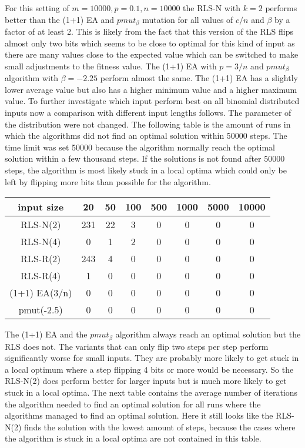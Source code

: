 For this setting of $m=10000, p=0.1, n=10000$ the RLS-N with $k=2$ performs better than the  (1+1) EA and $pmut_\beta$ mutation for all values of $c/n$ and $\beta$ by a factor of at least 2.
This is likely from the fact that this version of the RLS flips almost only two bits which seems to be close to optimal for this kind of input as there are many values close to the expected value which can be switched to make small adjustments to the fitness value.
The (1+1) EA with $p=3/n$ and $pmut_\beta$ algorithm with $\beta=-2.25$ perform almost the same.
The (1+1) EA has a slightly lower average value but also has a higher minimum value and a higher maximum value.
To further investigate which input perform best on all binomial distributed inputs now a comparison with different input lengths follows. The parameter of the distribution were not changed.
The following table is the amount of runs in which the algorithms did not find an optimal solution within 50000 steps.
The time limit was set 50000 because the algorithm normally reach the optimal solution within a few thousand steps.
If the solutions is not found after 50000 steps, the algorithm is most likely stuck in a local optima which could only be left by flipping more bits than possible for the algorithm.

\begin{tabular}{cccccccc}
      input size    & 20  & 50 & 100 & 500 & 1000 & 5000 & 10000 \\\hline
      RLS-N(2)      & 231 & 22 & 3   & 0   & 0    & 0    & 0     \\
      RLS-N(4)      & 0   & 1  & 2   & 0   & 0    & 0    & 0     \\
      RLS-R(2)      & 243 & 4  & 0   & 0   & 0    & 0    & 0     \\
      RLS-R(4)      & 1   & 0  & 0   & 0   & 0    & 0    & 0     \\
      (1+1) EA(3/n) & 0   & 0  & 0   & 0   & 0    & 0    & 0     \\
      pmut(-2.5)    & 0   & 0  & 0   & 0   & 0    & 0    & 0     \\
\end{tabular}

The (1+1) EA and the $pmut_\beta$ algorithm always reach an optimal solution but the RLS does not.
The variants that can only flip two steps per step perform significantly worse for small inputs.
They are probably more likely to get stuck in a local optimum where a step flipping 4 bits or more would be necessary.
So the RLS-N(2) does perform better for larger inputs but is much more likely to get stuck in a local optima.
The next table contains the average number of iterations the algorithm needed to find an optimal solution for all runs where the algorithms managed to find an optimal solution.
Here it still looks like the RLS-N(2) finds the solution with the lowest amount of steps, because the cases where the algorithm is stuck in a local optima are not contained in this table.


